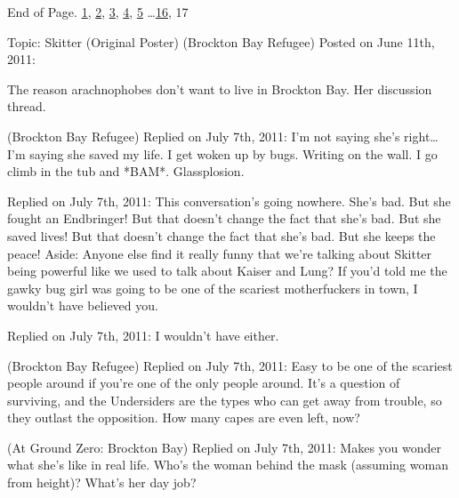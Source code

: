 End of Page.   \underline{1}, \underline{2}, \underline{3}, \underline{4}, \underline{5} \ldots \underline{16}, 17



\sectionbreak



\blacklozenge  Topic:  Skitter (Original Poster) (Brockton Bay Refugee)
Posted on June 11th, 2011:



The reason arachnophobes don't want to live in Brockton Bay.  Her discussion thread.






\blacktriangleright\strong{  } (Brockton Bay Refugee)
Replied on July 7th, 2011:
I'm not saying she's right\ldots  I'm saying she saved my life.  I get woken up by bugs.  Writing on the wall.  I go climb in the tub and *BAM*.  Glassplosion.



Replied on July 7th, 2011:
This conversation's going nowhere.  She's bad.  But she fought an Endbringer!  But that doesn't change the fact that she's bad.  But she saved lives!  But that doesn't change the fact that she's bad.  But she keeps the peace!
Aside:  Anyone else find it really funny that we're talking about Skitter being powerful like we used to talk about Kaiser and Lung?  If you'd told me the gawky bug girl was going to be one of the scariest motherfuckers in town, I wouldn't have believed you.



\blacktriangleright {}Replied on July 7th, 2011:
I wouldn't have either.



\blacktriangleright {}(Brockton Bay Refugee)
Replied on July 7th, 2011:
Easy to be one of the scariest people around if you're one of the only people around.  It's a question of surviving, and the Undersiders are the types who can get away from trouble, so they outlast the opposition.  How many capes are even left, now?



\blacktriangleright {} (At Ground Zero: Brockton Bay)
Replied on July 7th, 2011:
Makes you wonder what she's like in real life.  Who's the woman behind the mask (assuming woman from height)?  What's her day job?\strong{ }



